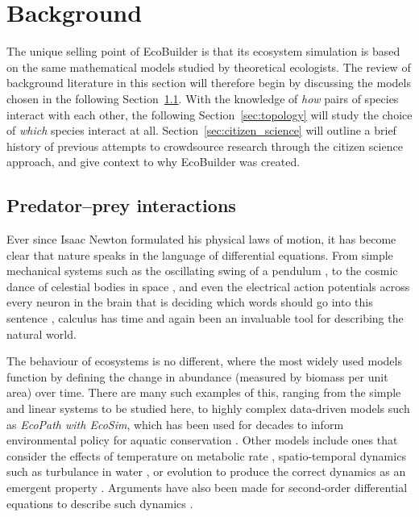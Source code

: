 \section{Background}
\label{sec:joy_background}
The unique selling point of EcoBuilder is that its ecosystem simulation is based on the same mathematical models studied by theoretical ecologists. The review of background literature in this section will therefore begin by discussing the models chosen in the following Section~\ref{sec:predator_prey}. With the knowledge of \emph{how} pairs of species interact with each other, the following Section~\ref{sec:topology} will study the choice of \emph{which} species interact at all. Section~\ref{sec:citizen_science} will outline a brief history of previous attempts to crowdsource research through the citizen science approach, and give context to why EcoBuilder was created.

\subsection{Predator--prey interactions}
\label{sec:predator_prey}
Ever since Isaac Newton formulated his physical laws of motion, it has become clear that nature speaks in the language of differential equations. From simple mechanical systems such as the oscillating swing of a pendulum \cite{Fulcher1976}, to the cosmic dance of celestial bodies in space \cite{Marchal2012}, and even the electrical action potentials across every neuron in the brain that is deciding which words should go into this sentence \cite{Hodgkin1952}, calculus has time and again been an invaluable tool for describing the natural world. 

The behaviour of ecosystems is no different, where the most widely used models function by defining the change in abundance (measured by biomass per unit area) over time.
There are many such examples of this, ranging from the simple and linear systems to be studied here, to highly complex data-driven models such as \emph{EcoPath with EcoSim}, which has been used for decades to inform environmental policy for aquatic conservation \cite{Christensen2004}.
Other models include ones that consider the effects of temperature on metabolic rate \cite{Savage2004, Dell2014}, spatio-temporal dynamics such as turbulance in water \cite{Watteaux2015}, or evolution to produce the correct dynamics as an emergent property \cite{Laird2008}. Arguments have also been made for second-order differential equations to describe such dynamics \cite{Colyvan2003}.

